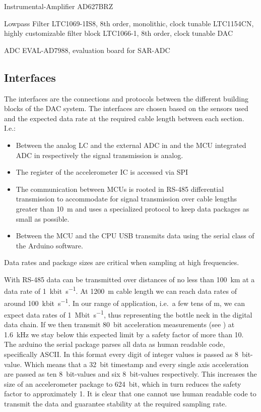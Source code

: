 Instrumental-Amplifier
AD627BRZ

Lowpass Filter
LTC1069-1IS8, 8th order, monolithic, clock tunable
LTC1154CN, highly customizable filter block
LTC1066-1, 8th order, clock tunable DAC

ADC
EVAL-AD7988, evaluation board for SAR-ADC





\subsection{Interfaces}

The interfaces are the connections and protocols between the different building blocks of the \ac{DAC} system. The interfaces are chosen based on the sensors used and the expected data rate at the required cable length between each section. I.e.:

\begin{itemize}
  \item Between the analog \ac{LC} and the external \ac{ADC} in  and the \ac{MCU} integrated \ac{ADC}  in  respectively the signal transmission is analog.
  \item The register of the accelerometer \ac{IC} is accessed via \ac{SPI}
  \item The communication between \acs{MCU}s is rooted in \acs{RS}-485 differential transmission to accommodate for signal transmission over cable lengths greater than \SI{10}{\meter} and uses a specialized protocol to keep data packages as small as possible.
  \item Between the \ac{MCU} and the \ac{CPU} \ac{USB} transmits data using the serial class of the Arduino software.
\end{itemize}

Data rates and package sizes are critical when sampling at high frequencies.

With \ac{RS}-485 data can be transmitted over distances of no less than \SI{100}{\km} at a data rate of \SI{1}{\kilo bit\per\second}. At \SI{1200}{\meter} cable length we can reach data rates of around \SI{100}{\kilo bit\per\second}. In our range of application, i.e.\ a few tens of \si{\meter}, we can expect data rates of \SI{1}{\mega bit\per\second}, thus representing the bottle neck in the digital data chain. If we then transmit \SI{80}{bit} acceleration measurements (see ) at \SI{1.6}{\kilo\hertz} we stay below this expected limit by a safety factor of more than 10.
The arduino the serial package parses all data as human readable code, specifically \acf{ASCII}. In this format every digit of integer values is passed as \SI{8}{bit}-value. Which means that a \SI{32}{bit} timestamp and every single axis acceleration are passed as ten \SI{8}{bit}-values and six \SI{8}{bit}-values respectively. This increases the size of an accelerometer package to \SI{624}{bit}, which in turn reduces the safety factor to approximately 1.
It is clear that one cannot use human readable code to transmit the data and guarantee stability at the required sampling rate.


